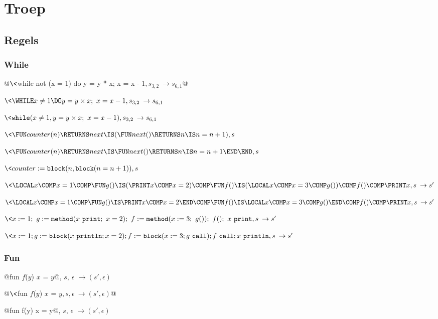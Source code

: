 \chapter{Troep}

\section{Regels}

\subsection{While}

@$\<$while not (x = 1) do y = y * x; x = x - 1$, s_{3,2}\> \to s_{6,1}$@

$\<\WHILE x \neq 1 \DO y = y \times x;~ x = x - 1, s_{3,2}\> \to s_{6,1}$

$\<\mathtt{while}(x \neq 1, y = y \times x;~ x = x - 1), s_{3,2}\> \to s_{6,1}$

$\<\FUN counter(n) \RETURNS next \IS (\FUN next() \RETURNS n \IS n = n + 1), s\>$

$\<\FUN counter(n) \RETURNS next \IS \FUN next() \RETURNS n \IS n = n + 1 \END \END, s\>$

$\<counter := \mathtt{block}(n, \mathtt{block}(n = n + 1)), s\>$

$\<\LOCAL x\COMP x=1\COMP
   \FUN g() \IS (\PRINT x\COMP x=2)\COMP
   \FUN f() \IS (\LOCAL x\COMP x=3\COMP g())\COMP
   f()\COMP
   \PRINT x,
s\> \to s'$


$\<\LOCAL x\COMP x=1\COMP
   \FUN g() \IS \PRINT x\COMP x=2 \END\COMP
   \FUN f() \IS \LOCAL x\COMP x=3\COMP g() \END\COMP
   f()\COMP
   \PRINT x,
s\> \to s'$

$\<x:=1;~
   g:=\mathtt{method}(x \mathtt{~print};~ x=2);~
   f:=\mathtt{method}(x:=3;~ g());~
   f();~
   x \mathtt{~print}, 
s\> \to s'$

$\<x:=1;
   g:=\mathtt{block}(x \mathtt{~println}; x=2);
   f:=\mathtt{block}(x:=3; g \mathtt{~call});
   f \mathtt{~call};
   x \mathtt{~println}, 
s\> \to s'$

\subsection{Fun}

\<@fun $f$($y$) {$x$ = $y$}@, $s$, $\epsilon$\> $\to (s',\epsilon)$

@$\<$fun $f$($y$) {$x$ = $y$}$, s, \epsilon\> \to (s',\epsilon)$@

\<@fun f(y) {x = y}@, $s$, $\epsilon$\> $\to (s',\epsilon)$

